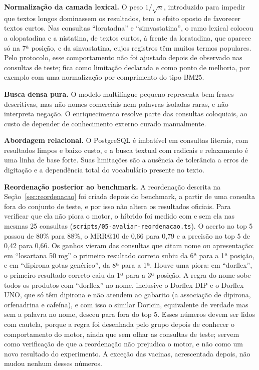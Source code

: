 \documentclass[12pt,oneside,a4paper,english,brazil]{abntex2}
\newcommand{\campo}[1]{\texttt{#1}}
\begin{document}
\textbf{Normalização da camada lexical.} O peso $1/\sqrt{n}$, introduzido para impedir que textos longos dominassem os resultados, tem o efeito oposto de favorecer textos curtos. Nas consultas ``loratadna'' e ``simvastatina'', o ramo lexical colocou a olopatadina e a nistatina, de textos curtos, à frente da loratadina, que aparece só na 7ª posição, e da sinvastatina, cujos registros têm muitos termos populares. Pelo protocolo, esse comportamento não foi ajustado depois de observado nas consultas de teste; fica como limitação declarada e como ponto de melhoria, por exemplo com uma normalização por comprimento do tipo BM25.

\textbf{Busca densa pura.} O modelo multilíngue pequeno representa bem frases descritivas, mas não nomes comerciais nem palavras isoladas raras, e não interpreta negação. O enriquecimento resolve parte das consultas coloquiais, ao custo de depender de conhecimento externo curado manualmente.

\textbf{Abordagem relacional.} O PostgreSQL é imbatível em consultas literais, com resultados limpos e baixo custo, e a busca textual com radicais e relaxamento é uma linha de base forte. Suas limitações são a ausência de tolerância a erros de digitação e a dependência total do vocabulário presente no texto.

\textbf{Reordenação posterior ao benchmark.} A reordenação descrita na Seção~\ref{sec:reordenacao} foi criada depois do benchmark, a partir de uma consulta fora do conjunto de teste, e por isso não altera os resultados oficiais. Para verificar que ela não piora o motor, o híbrido foi medido com e sem ela nas mesmas 25 consultas (\campo{scripts/05-avaliar-reordenacao.ts}). O acerto no top 5 passou de 80\% para 88\%, o MRR@10 de 0,66 para 0,79 e a precisão no top 5 de 0,42 para 0,66. Os ganhos vieram das consultas que citam nome ou apresentação: em ``losartana 50 mg'' o primeiro resultado correto subiu da 6ª para a 1ª posição, e em ``dipirona gotas genérico'', da 8ª para a 1ª. Houve uma piora: em ``dorflex'', o primeiro resultado correto caiu da 1ª para a 3ª posição. A regra do nome sobe todos os produtos com ``dorflex'' no nome, inclusive o Dorflex DIP e o Dorflex UNO, que só têm dipirona e não atendem ao gabarito (a associação de dipirona, orfenadrina e cafeína), e com isso o similar Doricin, equivalente de verdade mas sem a palavra no nome, desceu para fora do top 5. Esses números devem ser lidos com cautela, porque a regra foi desenhada pelo grupo depois de conhecer o comportamento do motor, ainda que sem olhar as consultas de teste; servem como verificação de que a reordenação não prejudica o motor, e não como um novo resultado do experimento. A exceção das vacinas, acrescentada depois, não mudou nenhum desses números.
\end{document}

